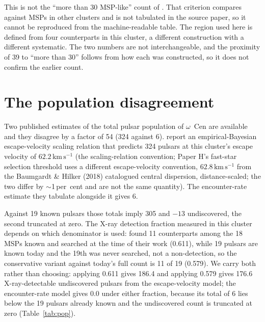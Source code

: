 \documentclass[11pt]{article}
\newcommand{\ocen}{$\omega$~Cen}
\begin{document}
This is not the ``more than 30 MSP-like'' count of \citet{Henleywillis2018}. That criterion compares against MSPs in other clusters and is not tabulated in the source paper, so it cannot be reproduced from the machine-readable table. The region used here is defined from four counterparts in this cluster, a different construction with a different systematic. The two numbers are not interchangeable, and the proximity of 39 to ``more than 30'' follows from how each was constructed, so it does not confirm the earlier count.

\section{The population disagreement}
\label{sec:tension}

Two published estimates of the total pulsar population of \ocen{} are available and they disagree by a factor of 54 (324 against 6). \citet{Yin2024} report an empirical-Bayesian escape-velocity scaling relation that predicts 324 pulsars at this cluster's escape velocity of $62.2\,\mathrm{km\,s^{-1}}$ (the \citealt{Yin2024} scaling-relation convention; Paper H's fast-star selection threshold uses a different escape-velocity convention, $62.8\,\mathrm{km\,s^{-1}}$ from the Baumgardt \& Hilker (2018) catalogued central dispersion, distance-scaled; the two differ by $\sim$1\,per~cent and are not the same quantity). The encounter-rate estimate they tabulate alongside it gives 6.

Against 19 known pulsars those totals imply 305 and $-13$ undiscovered, the second truncated at zero. The X-ray detection fraction measured in this cluster depends on which denominator is used: \citet{ZhaoHeinke2023} found 11 counterparts among the 18 MSPs known and searched at the time of their work (0.611), while 19 pulsars are known today and the 19th was never searched, not a non-detection, so the conservative variant against today's full count is 11 of 19 (0.579). We carry both rather than choosing: applying 0.611 gives 186.4 and applying 0.579 gives 176.6 X-ray-detectable undiscovered pulsars from the escape-velocity model; the encounter-rate model gives 0.0 under either fraction, because its total of 6 lies below the 19 pulsars already known and the undiscovered count is truncated at zero (Table~\ref{tab:pop}).
\end{document}
